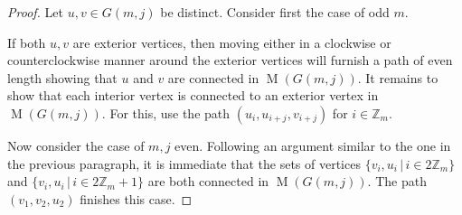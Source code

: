 \documentclass[12pt]{amsart}
\theoremstyle{definition}
\theoremstyle{remark}
\numberwithin{equation}{section}
\numberwithin{figure}{section}
\newcommand{\M}{\operatorname{M}}
\newcommand{\Z}{\mathbb{Z}}
\begin{document}
\begin{proof}
    Let $u,v\in G(m,j)$ be distinct.   
    Consider first the case of odd $m$.

    If both $u,v$ are exterior vertices, then moving either in a clockwise or counterclockwise manner around the exterior vertices will furnish a path of even length showing that $u$ and $v$ are connected in $\M(G(m,j))$. It remains to show that each interior vertex is connected to an exterior vertex in $\M(G(m,j))$. For this, use the path $(u_i,u_{i+j},v_{i+j})$ for $i\in\Z_m$.

    Now consider the case of $m,j$ even. Following an argument similar to the one in the previous paragraph, it is immediate that the sets of vertices $\{v_i, u_i \,|\, i\in 2\Z_m\}$ and $\{v_i, u_i \,|\, i\in 2\Z_m+1\}$ are both connected in $\M(G(m,j))$. The path $(v_1,v_2,u_{2})$ finishes this case.


\end{proof}
\end{document}
